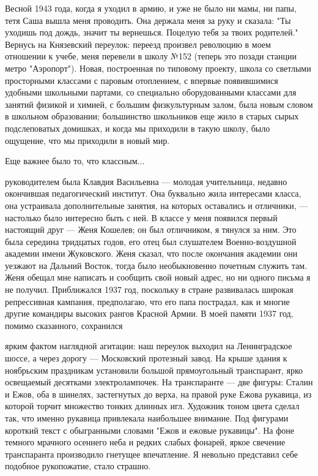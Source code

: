 
\label{157-1}
Весной 1943 года, когда я уходил в армию, и уже не было ни мамы, ни папы, тетя Саша вышла меня проводить. Она держала меня за руку и сказала: "Ты уходишь под дождь, значит ты вернешься. Поцелую тебя за твоих родителей." 
Вернусь на Князевский переулок: переезд произвел революцию в моем отношении к учебе, меня перевели в школу №152 (теперь это позади станции метро "Аэропорт"). Новая, построенная по типовому проекту, школа со светлыми просторными классами с паровым отоплением, с впервые появившимися удобными школьными партами, со специально оборудованными классами для занятий физикой и химией, с большим физкультурным залом, была новым словом в школьном образовании; большинство школьников еще жило в старых сырых подслеповатых домишках, и когда мы приходили в такую школу, было ощущение, что мы приходили в новый мир.

Еще важнее было то, что классным...

\label{158-1}
руководителем была Клавдия Васильевна — молодая учительница, недавно окончившая педагогический институт. Она буквально жила интересами класса, она устраивала дополнительные занятия, на которых оставались и отличники, — настолько было интересно быть с ней. В классе у меня появился первый настоящий друг — Женя Кошелев; он был отличником, я тянулся за ним. Это была середина тридцатых годов, его отец был слушателем Военно-воздушной академии имени Жуковского. Женя сказал, что после окончания академии они уезжают на Дальний Восток, тогда было необыкновенно почетным служить там. Женя обещал мне написать и сообщить свой новый адрес, но ни одного письма я не получил. Приближался 1937 год, поскольку в стране развивалась широкая репрессивная кампания, предполагаю, что его папа пострадал, как и многие другие командиры высоких рангов Красной Армии. В моей памяти 1937 год, помимо сказанного, сохранился 

\label{159-1}
ярким фактом наглядной агитации: наш переулок выходил на Ленинградское шоссе, а через дорогу — Московский протезный завод. На крыше здания к ноябрьским праздникам установили большой прямоугольный транспарант, ярко освещаемый десятками электролампочек. На транспаранте — две фигуры: Сталин и Ежов, оба в шинелях, застегнутых до верха, на правой руке Ежова рукавица, из которой торчит множество тонких длинных игл. Художник тоном цвета сделал так, что именно рукавица привлекала наибольшее внимание. Под фигурами короткий текст с обыгранными словами "Ежов и ежовые рукавицы". На фоне темного мрачного осеннего неба и редких слабых фонарей, яркое свечение транспаранта производило гнетущее впечатление. Я невольно представил себе подобное рукопожатие, стало страшно.

